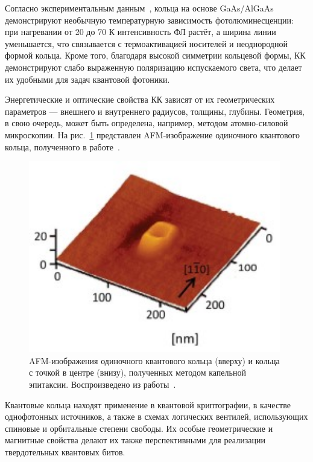 \documentclass[14pt,oneside]{extarticle}
\begin{document}
Согласно экспериментальным данным~\cite{sibirmovskiy2018}, кольца на основе GaAs/AlGaAs демонстрируют необычную температурную зависимость фотолюминесценции: при нагревании от 20 до 70 К интенсивность ФЛ растёт, а ширина линии уменьшается, что связывается с термоактивацией носителей и неоднородной формой кольца. Кроме того, благодаря высокой симметрии кольцевой формы, КК демонстрируют слабо выраженную поляризацию испускаемого света, что делает их удобными для задач квантовой фотоники.

Энергетические и оптические свойства КК зависят от их геометрических параметров — внешнего и внутреннего радиусов, толщины, глубины. Геометрия, в свою очередь, может быть определена, например, методом атомно-силовой микроскопии. На рис.~\ref{fig:elborg2} представлен AFM-изображение одиночного квантового кольца, полученного в работе~\cite{elborg2017}.

\begin{figure}
    \begin{center}
        \includegraphics[width=11cm]{images/elborg_fig2.jpg}
        \caption{\label{fig:elborg2}
            AFM-изображения одиночного квантового кольца (вверху) и кольца с точкой в центре (внизу), полученных методом капельной эпитаксии. Воспроизведено из работы~\cite{elborg2017}.}
    \end{center}
\end{figure}

Квантовые кольца находят применение в квантовой криптографии, в качестве однофотонных источников, а также в схемах логических вентилей, использующих спиновые и орбитальные степени свободы. Их особые геометрические и магнитные свойства делают их также перспективными для реализации твердотельных квантовых битов.
\end{document}
